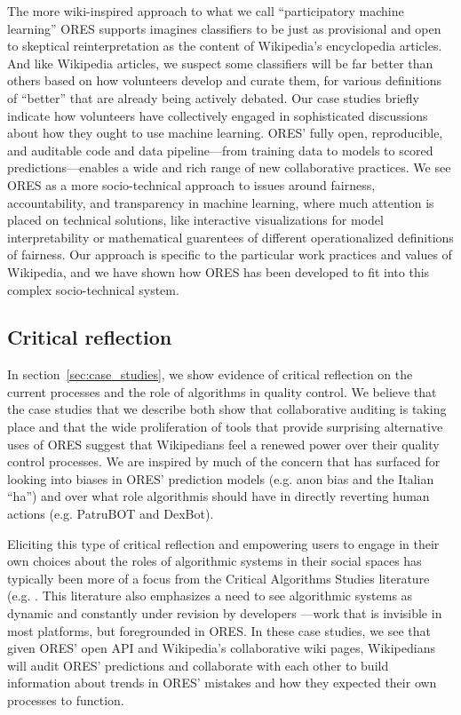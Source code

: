 The more wiki-inspired approach to what we call ``participatory machine learning'' ORES supports imagines classifiers to be just as provisional and open to skeptical reinterpretation as the content of Wikipedia's encyclopedia articles. And like Wikipedia articles, we suspect some classifiers will be far better than others based on how volunteers develop and curate them, for various definitions of ``better'' that are already being actively debated. Our case studies briefly indicate how volunteers have collectively engaged in sophisticated discussions about how they ought to use machine learning. ORES' fully open, reproducible, and auditable code and data pipeline---from training data to models to scored predictions---enables a wide and rich range of new collaborative practices. We see ORES as a more socio-technical approach to issues around fairness, accountability, and transparency in machine learning, where much attention is placed on technical solutions, like interactive visualizations for model interpretability or mathematical guarentees of different operationalized definitions of fairness. Our approach is specific to the particular work practices and values of Wikipedia, and we have shown how ORES has been developed to fit into this complex socio-technical system.

\subsection{Critical reflection}
In section~\ref{sec:case_studies}, we show evidence of critical reflection on the current processes and the role of algorithms in quality control.  We believe that the case studies that we describe both show that collaborative auditing is taking place and that the wide proliferation of tools that provide surprising alternative uses of ORES suggest that Wikipedians feel a renewed power over their quality control processes.  We are inspired by much of the concern that has surfaced for looking into biases in ORES' prediction models (e.g. anon bias and the Italian ``ha'') and over what role algorithmis should have in directly reverting human actions (e.g. PatruBOT and DexBot).

Eliciting this type of critical reflection and empowering users to engage in their own choices about the roles of algorithmic systems in their social spaces has typically been more of a focus from the Critical Algorithms Studies literature (e.g. \cite{barocas2013governing, kitchin2017thinking}. This literature also emphasizes a need to see algorithmic systems as dynamic and constantly under revision by developers \cite{seaver2017algorithms}---work that is invisible in most platforms, but foregrounded in ORES. In these case studies, we see that given ORES' open API and Wikipedia's collaborative wiki pages, Wikipedians will audit ORES' predictions and collaborate with each other to build information about trends in ORES' mistakes and how they expected their own processes to function.

